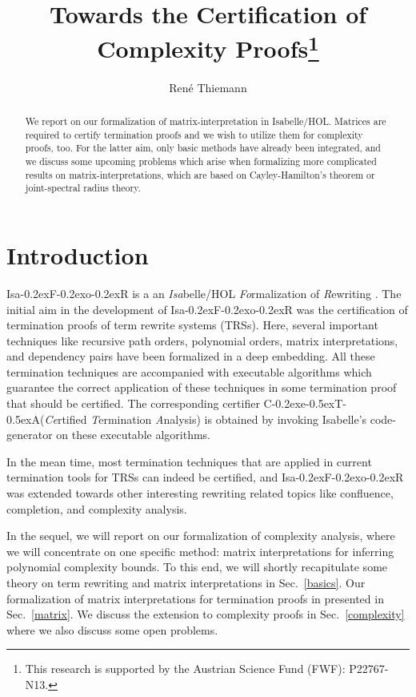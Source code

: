 \documentclass[a4paper]{llncs}
\newcommand{\rSC}[1]{\secref{#1}}
\newcommand\ceta{\textsf{C\kern-0.2exe\kern-0.5exT\kern-0.5exA}\xspace}
\newcommand\isafor{\textsf{Isa\kern-0.2exF\kern-0.2exo\kern-0.2exR}\xspace}
\newcommand\secref[1]{Sec.~\ref{#1}}
\begin{document}
\mainmatter

\title{Towards the Certification of Complexity Proofs\thanks{This research is supported by the Austrian Science Fund (FWF): P22767-N13.}}

\author{
Ren\'e Thiemann}



\maketitle

\begin{abstract}
We report on our formalization of matrix-interpretation in Isabelle/HOL.
Matrices are required to certify termination proofs and we wish to utilize
them for complexity proofs, too.
For the latter aim, only basic methods have already been integrated, and we discuss
some upcoming problems which arise when formalizing more complicated 
results on matrix-interpretations, which are based on Cayley-Hamilton's
theorem or joint-spectral radius theory.
\end{abstract}


\section{Introduction}

\isafor is a an \emph{Isa}belle/HOL \cite{Isabelle} \emph{Fo}rmalization of \emph{R}ewriting \cite{CeTA}. 
The initial aim in the development of \isafor was the certification of 
termination proofs of term rewrite systems (TRSs). Here, several important
techniques like recursive path orders, polynomial orders, matrix interpretations,
and dependency pairs have been formalized in a deep embedding. All these termination
techniques are accompanied with executable algorithms which guarantee the correct
application of these techniques in some termination proof that should be 
certified. The corresponding certifier \ceta (\emph{Ce}rtified 
\emph{T}ermination \emph{A}nalysis)
is obtained by invoking Isabelle's
code-generator \cite{codegen10} on these executable algorithms. 

In the mean time, most termination techniques that are applied in current
termination tools for TRSs can indeed be certified, and \isafor was extended
towards other interesting rewriting related 
topics like confluence, completion, and complexity analysis.

In the sequel, we will report on our formalization of complexity analysis,
where we will concentrate on one specific method: matrix 
interpretations for inferring polynomial complexity bounds.
To this end, we will shortly recapitulate some theory on term rewriting
and matrix interpretations
 in \rSC{basics}.  Our formalization of matrix interpretations
for termination proofs in presented in \rSC{matrix}. We discuss the extension
to complexity proofs in \rSC{complexity} where we also discuss some open problems.
\end{document}

